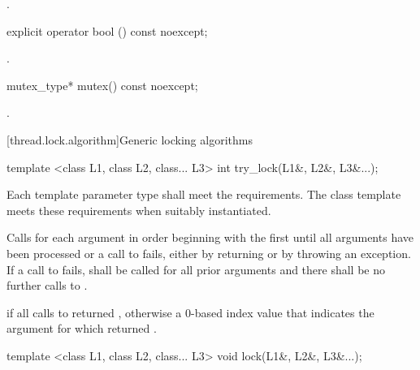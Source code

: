 \begin{itemdescr}
\pnum
\returns {}.
\end{itemdescr}

%
%
\begin{itemdecl}
explicit operator bool () const noexcept;
\end{itemdecl}

\begin{itemdescr}
\pnum
\returns {}.
\end{itemdescr}

%
%
\begin{itemdecl}
mutex_type* mutex() const noexcept;
\end{itemdecl}

\begin{itemdescr}
\pnum
\returns {}.
\end{itemdescr}

[thread.lock.algorithm]{Generic locking algorithms}

%
\begin{itemdecl}
template <class L1, class L2, class... L3> int try_lock(L1&, L2&, L3&...);
\end{itemdecl}

\begin{itemdescr}
\pnum
\requires Each template parameter type shall meet the  requirements. \enternote The
 class template meets these requirements when suitably instantiated.
\exitnote

\pnum
\effects Calls  for each argument in order beginning with the
first until all arguments have been processed or a call to  fails,
either by returning  or by throwing an exception. If a call to
 fails,  shall be called for all prior arguments
and there shall be no further calls to .

\pnum
\returns {} if all calls to  returned ,
otherwise a 0-based index value that indicates the argument for which 
returned .
\end{itemdescr}

%
\begin{itemdecl}
template <class L1, class L2, class... L3> void lock(L1&, L2&, L3&...);
\end{itemdecl}


